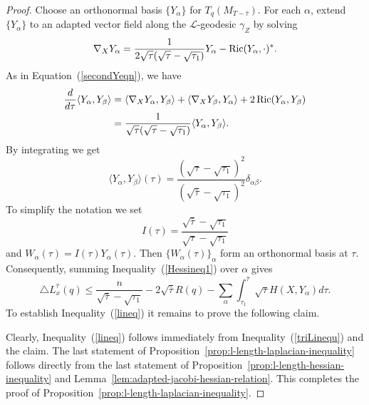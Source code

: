 \begin{proof}
\sketch

Choose an orthonormal basis $\{Y_{\alpha}\}$ for
$T_q(M_{T-\bar\tau})$. For each $\alpha$, extend $\{Y_{\alpha}\}$ to
an adapted vector field along the $ \mathcal{L}$-geodesic $\gamma_Z$
by solving
$$\nabla_{X}Y_{\alpha} = \frac{1}{2\sqrt{\tau}(\sqrt{\tau}-\sqrt{\tau_1})}Y_{\alpha}
-\operatorname{Ric}(Y_{\alpha},\cdot)^*.$$ As in Equation~(\ref{secondYeqn}),
we have
\begin{align*}
\frac{d}{d\tau}\langle Y_{\alpha},Y_{\beta}\rangle  &= \langle
\nabla_{X}Y_{\alpha},Y_{\beta}\rangle  + \langle
\nabla_{X}Y_{\beta}, Y_{\alpha}\rangle + 2\operatorname{Ric}(Y_{\alpha},Y_{\beta})
\\&= \frac{1}{\sqrt{\tau}(\sqrt{\tau}-\sqrt{\tau_1})}\langle Y_{\alpha},Y_{\beta}\rangle .
\end{align*}
 By integrating we get $$\langle Y_{\alpha},Y_{\beta}\rangle (\tau) =
\frac{(\sqrt{\tau}-\sqrt{\tau_1})^2}{(\sqrt{\bar\tau}-\sqrt{\tau_1})^2}\delta_{\alpha\beta}.$$
To simplify the notation we set
$$I(\tau)=\frac{\sqrt{\bar\tau}-\sqrt{\tau_1}}{\sqrt{\tau}-\sqrt{\tau_1}}$$
and $W_\alpha(\tau)=I(\tau)Y_\alpha(\tau)$.
 Then $\{W_{\alpha}(\tau)\}_\alpha$
form an orthonormal basis at $\tau$. Consequently, summing
Inequality~(\ref{Hessineq1}) over $\alpha$ gives
\begin{equation}\label{triLinequ}
\triangle L_x^{\bar\tau}(q)\le
\frac{n}{\sqrt{\bar\tau}-\sqrt{\tau_1}}
-2\sqrt{\bar\tau}R(q)-\sum_\alpha\int_{\tau_1}^{\bar\tau}\sqrt{\tau}H(X,Y_\alpha)d\tau.\end{equation}
To establish Inequality~(\ref{lineq}) it remains to prove the
following claim.


Clearly, Inequality~(\ref{lineq}) follows immediately from
Inequality~(\ref{triLinequ}) and the claim. The last statement of
Proposition~\ref{prop:l-length-laplacian-inequality} follows directly from the last statement of
Proposition~\ref{prop:l-length-hessian-inequality} and Lemma~\ref{lem:adapted-jacobi-hessian-relation}. This completes
the proof of Proposition~\ref{prop:l-length-laplacian-inequality}.
\end{proof}


